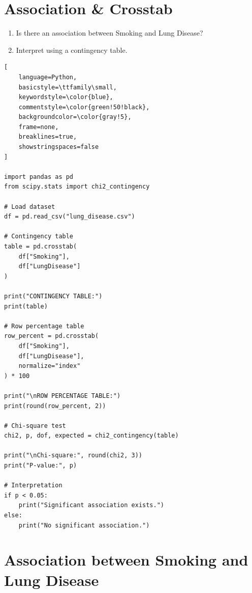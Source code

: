 \documentclass[12pt,a4paper]{report}
\begin{document}
\section*{Association \& Crosstab}
\begin{enumerate}
    \item Is there an association between Smoking and Lung Disease?
    \item Interpret using a contingency table.
\end{enumerate}
\begin{tcolorbox}[
    enhanced,
    colback=blue!3,
    colframe=blue!70!black,
    title=Association Between Smoking and Lung Disease,
    fonttitle=\bfseries,
    coltitle=white,
    colbacktitle=blue!70!black,
    arc=4pt,
    boxrule=1pt,
    breakable
]

\begin{lstlisting}[
    language=Python,
    basicstyle=\ttfamily\small,
    keywordstyle=\color{blue},
    commentstyle=\color{green!50!black},
    backgroundcolor=\color{gray!5},
    frame=none,
    breaklines=true,
    showstringspaces=false
]

import pandas as pd
from scipy.stats import chi2_contingency

# Load dataset
df = pd.read_csv("lung_disease.csv")

# Contingency table
table = pd.crosstab(
    df["Smoking"],
    df["LungDisease"]
)

print("CONTINGENCY TABLE:")
print(table)

# Row percentage table
row_percent = pd.crosstab(
    df["Smoking"],
    df["LungDisease"],
    normalize="index"
) * 100

print("\nROW PERCENTAGE TABLE:")
print(round(row_percent, 2))

# Chi-square test
chi2, p, dof, expected = chi2_contingency(table)

print("\nChi-square:", round(chi2, 3))
print("P-value:", p)

# Interpretation
if p < 0.05:
    print("Significant association exists.")
else:
    print("No significant association.")

\end{lstlisting}

\end{tcolorbox}
\section*{Association between Smoking and Lung Disease}
\end{document}

